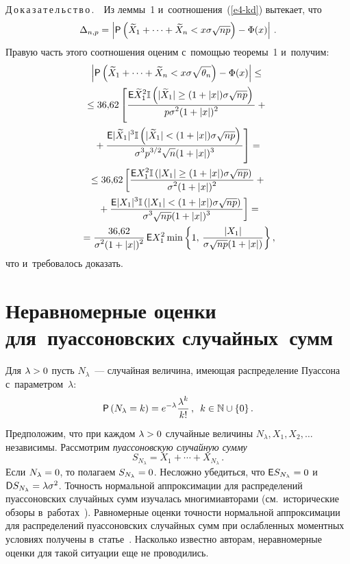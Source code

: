 \begin{multicols}{2}
\smallskip

\noindent
Д\,о\,к\,а\,з\,а\,т\,е\,л\,ь\,с\,т\,в\,о\,.\ \ Из леммы~1 и~соотношения~(\ref{e4-kd}) 
вытекает, что
$$
\Delta_{n,p}=\left\vert{\sf
P}\left(\widetilde{X}_1+\cdots+\widetilde{X}_n<x\sigma\sqrt{np}\right)-\Phi(x)\right\vert\,.
$$
Правую часть этого соотношения оценим с~по\-мощью теоремы~1 и~получим:
\begin{multline*}
\left\vert {\sf
P}\left(\widetilde{X}_1+\cdots+\widetilde{X}_n<
x\sigma\sqrt{\theta_n}\right)-\Phi(x)\right\vert \le{}
\\[1pt]
\le 36{,}62\left[\displaystyle\frac{\displaystyle {\sf
E}\widetilde{X}_1^2\mathbb{I}\left(|\widetilde{X}_1|\ge(1+|x|)\sigma\sqrt{np}\right)\mathstrut}{\displaystyle p\sigma^2(1+|x|)^2\mathstrut}+{}\right.\\[1pt]
\left.{}+
\displaystyle\frac{\displaystyle {\sf E}|\widetilde{X}_1|^3\mathbb{I}\left(|\widetilde{X}_1|<(1+|x|)
\sigma\sqrt{np}\right)\mathstrut}{\displaystyle \sigma^3p^{3/2}\sqrt{n}(1+|x|)^3\mathstrut}\right]={}
\\[1pt]
{}\le 36{,}62\left[\displaystyle\frac{\displaystyle {\sf E}X_1^2\mathbb{I}\left(|X_1|
\ge(1+|x|)\sigma\sqrt{np}\right)\mathstrut}{\displaystyle \sigma^2(1+|x|)^2\mathstrut}+{}\right.\\[1pt]
\left.{}+
\displaystyle\frac{\displaystyle {\sf E}|X_1|^3\mathbb{I}\left(|X_1|<(1+|x|)\sigma\sqrt{np}\right)\mathstrut}{\displaystyle \sigma^3\sqrt{np}(1+|x|)^3\mathstrut}\right]=
\\[1pt]
{}= \displaystyle\frac{\displaystyle 36{,}62\mathstrut}{\displaystyle \sigma^2(1+|x|)^2\mathstrut}\,{\sf E}X_1^2\min
\left\{1,\,\displaystyle\frac{\displaystyle |X_1|\mathstrut}{\displaystyle \sigma\sqrt{np}(1+|x|)\mathstrut}\right\},
\end{multline*}
что и~требовалось доказать.

\section{Неравномерные оценки для~пуассоновских случайных~сумм}

Для $\lambda\hm>0$ пусть $N_{\lambda}$~--- случайная величина, имеющая
распределение Пуассона с~параметром~$\lambda$:
$$
{\sf P}\left(N_{\lambda}=k\right)=e^{-\lambda}\displaystyle\frac{\displaystyle \lambda^k\mathstrut}{\displaystyle k!\mathstrut}\,,\enskip
k\in\mathbb{N}\cup \{0\}\,.
$$
Предположим, что при каждом $\lambda\hm>0$ случайные величины
$N_{\lambda},X_1,X_2,\ldots$ независимы. Рассмотрим \textit{пуассоновскую случайную сумму}
$$
S_{N_{\lambda}}=X_1+\cdots+X_{N_{\lambda}}\,.
$$
Если $N_{\lambda}\hm=0$, то полагаем $S_{N_{\lambda}}\hm=0$. Несложно
убедиться, что ${\sf E}S_{N_{\lambda}}\hm=0$ и~${\sf D}S_{N_{\lambda}}\hm=
\lambda\sigma^2$. Точность нормальной
аппроксимации для рас\-пре\-де\-лений пуассоновских случайных сумм
изучалась многими\linebreak автора\-ми (см.\ исторические обзоры 
в~рабо\-тах~\cite{KorolevShevtsova, ShevtsovaPoisson}). Равномерные оценки
точности нормальной аппроксимации для распределений пуассоновских
случайных сумм при ослабленных моментных условиях получены 
в~статье~\cite{KorolevDorofeevaLMJ}. Насколько известно авторам,
неравномерные оценки для такой ситуации еще не проводились.


\end{multicols}
